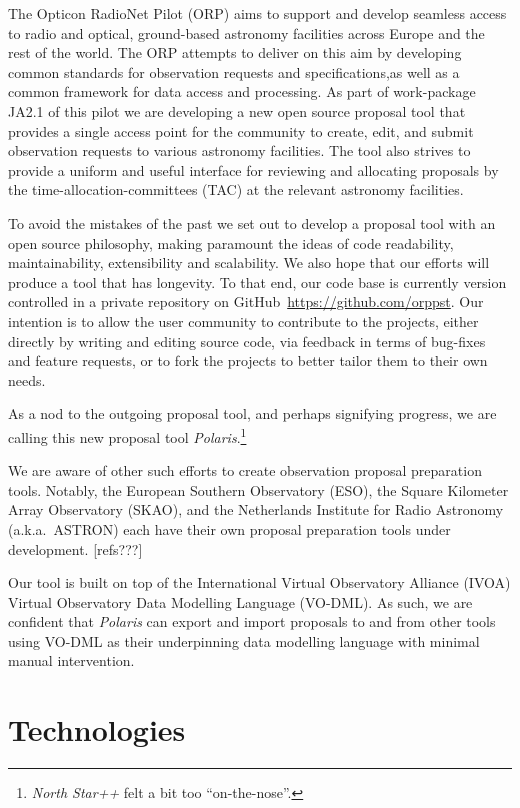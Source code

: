 \documentclass[11pt,twoside]{article}
\begin{document}
The Opticon RadioNet Pilot (ORP) aims to support and develop seamless access to radio and optical,
ground-based astronomy facilities across Europe and the rest of the world.
The ORP attempts to deliver on this aim by developing common standards for observation requests and
specifications,as well as a common framework for data access and processing.
As part of work-package JA2.1 of this pilot we are developing a new open source proposal tool that provides
a single access point for the community to create, edit, and submit observation requests to various astronomy
facilities.
The tool also strives to provide a uniform and useful interface for reviewing and allocating proposals by the
time-allocation-committees (TAC) at the relevant astronomy facilities.

To avoid the mistakes of the past we set out to develop a proposal tool with an open source philosophy, making
paramount the ideas of code readability, maintainability, extensibility and scalability.
We also hope that our efforts will produce a tool that has longevity.
To that end, our code base is currently version controlled in a private repository on
GitHub~\url{https://github.com/orppst}.
Our intention is to allow the user community to contribute to the projects, either directly by writing and
editing source code, via feedback in terms of bug-fixes and feature requests, or to fork the projects to
better tailor them to their own needs.

As a nod to the outgoing proposal tool, and perhaps signifying progress, we are calling this new proposal tool
\emph{Polaris}.\footnote{\emph{North Star++} felt a bit too ``on-the-nose''.}

We are aware of other such efforts to create observation proposal preparation tools.
Notably, the European Southern Observatory (ESO), the Square Kilometer Array Observatory (SKAO), and the
Netherlands Institute for Radio Astronomy (a.k.a.\ ASTRON) each have their own proposal preparation tools
under development.
[refs???]

Our tool is built on top of the International Virtual Observatory Alliance (IVOA) Virtual
Observatory Data Modelling Language (VO-DML).
As such, we are confident that \emph{Polaris} can export and import proposals to and from other tools using
VO-DML as their underpinning data modelling language with minimal manual intervention.


\section{Technologies}\label{sec:technologies}
\end{document}
